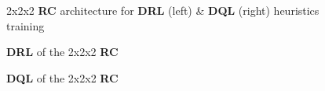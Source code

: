 \begin{figure}
  \noindent
  \caption[222RCnets]{2x2x2 \textbf{RC} architecture for \textbf{DRL} (left) \& \textbf{DQL} (right) heuristics training}
  \label{fig:222RCnets}
\end{figure}


\begin{figure}
  \noindent
  \caption[222RCDRL]{\textbf{DRL} of the 2x2x2 \textbf{RC}}
  \label{fig:222RCDRL}
\end{figure}

\begin{figure}
  \noindent
  \caption[222RCDQL]{\textbf{DQL} of the 2x2x2 \textbf{RC}}
  \label{fig:222RCDQL}
\end{figure}

